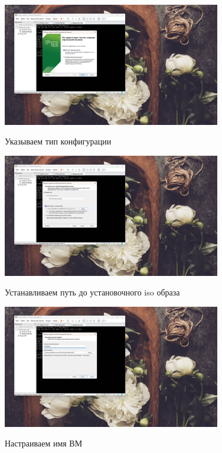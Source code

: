 \documentclass[a4paper]{article}
\begin{document}
  \begin{figure}[H]
    \centering
    \includegraphics[width=0.85\textwidth]{06_00 (76)}
    \label{img:76}
    \caption{Указываем тип конфигурации}
  \end{figure}
  
  \begin{figure}[H]
    \centering
    \includegraphics[width=0.85\textwidth]{06_00 (77)}
    \label{img:77}
    \caption{Устанавливаем путь до установочного iso образа}
  \end{figure}
  
  \begin{figure}[H]
    \centering
    \includegraphics[width=0.85\textwidth]{06_00 (78)}
    \label{img:78}
    \caption{Настраиваем имя ВМ}
  \end{figure}
  
\end{document}
